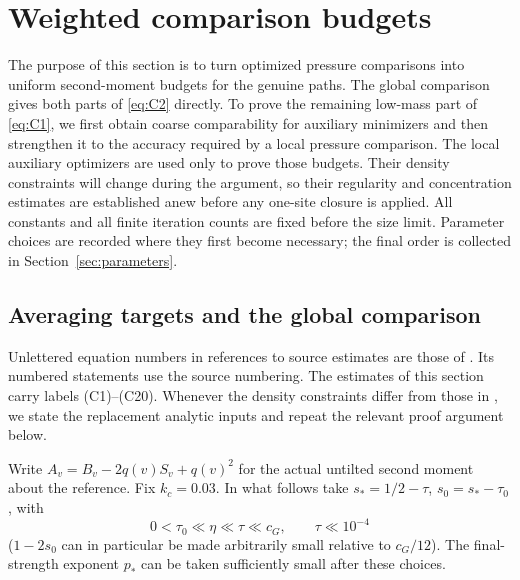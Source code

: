 \section{Weighted comparison budgets}\label{sec:budgets}

The purpose of this section is to turn optimized pressure comparisons into
uniform second-moment budgets for the genuine paths. The global
comparison gives both parts of \eqref{eq:C2} directly. To prove the
remaining low-mass part of \eqref{eq:C1}, we first obtain coarse
comparability for auxiliary minimizers and then strengthen it to the
accuracy required by a local pressure comparison. The local auxiliary
optimizers are used only to prove those budgets.  Their density constraints
will change during the argument, so their regularity and concentration
estimates are established anew before any one-site closure is applied.
All constants and all finite iteration counts are fixed before the size
limit.  Parameter choices are recorded where they first become necessary;
the final order is collected in Section~\ref{sec:parameters}.

\subsection{Averaging targets and the global comparison}

Unlettered equation numbers in references to source estimates are those
of \cite{PE}. Its numbered statements use the source numbering.
The estimates of this section carry labels (C1)--(C20).
Whenever the density constraints differ from those in \cite{PE}, we
state the replacement analytic inputs and repeat the relevant proof
argument below.

Write \(A_v=B_v-2q(v)S_v+q(v)^2\) for the actual untilted second moment about the reference. Fix \(k_c=0.03\). In what follows take \(s_*=1/2-\tau\), \(s_0=s_*-\tau_0\), with
\[
 0<\tau_0\ll\eta\ll\tau\ll c_G,\qquad \tau\ll 10^{-4}
\]
(\(1-2s_0\) can in particular be made arbitrarily small relative to \(c_G/12\)). The final-strength exponent \(p_*\) can be taken sufficiently small after these choices.


